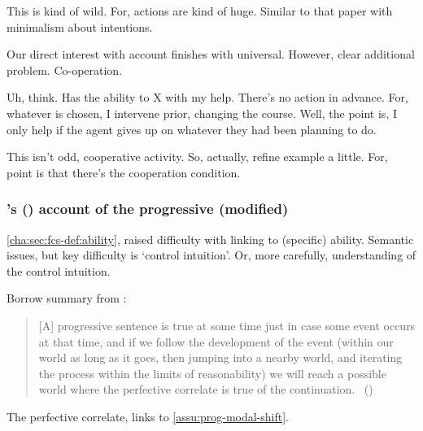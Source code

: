 \begin{note}
  This is kind of wild.
  For, actions are kind of huge.
  Similar to that paper with minimalism about intentions.
\end{note}

\begin{note}
  Our direct interest with account finishes with universal.
  However, clear additional problem.
  Co-operation.
\end{note}

\begin{note}
  Uh, think.
  Has the ability to X with my help.
  There's no action in advance.
  For, whatever is chosen, I intervene prior, changing the course.
  Well, the point is, I only help if the agent gives up on whatever they had been planning to do.

  This isn't odd, cooperative activity.
  So, actually, refine example a little.
  For, point is that there's the cooperation condition.
\end{note}

\subsubsection{\citeauthor{Landman:1992wh}'s (\citeyear{Landman:1992wh}) account of the progressive (modified)}
\label{cha:sec:fcs-def:progressive-landman}
\nocite{Portner:1998um}
\nocite{Engelberg:1999vi}

\begin{note}
  \autoref{cha:sec:fcs-def:ability}, raised difficulty with linking  to (specific) ability.
  Semantic issues, but key difficulty is `control intuition'.
  Or, more carefully, understanding of the control intuition.
\end{note}

\begin{note}
  Borrow summary from \textcite{Szabo:2004ul}:
  \begin{quote}
    [A] progressive sentence is true at some time just in case some event occurs at that time, and if we follow the development of the event (within our world as long as it goes, then jumping into a nearby world, and iterating the process within the limits of reasonability) we will reach a possible world where the perfective correlate is true of the continuation.%
    \mbox{ }\hfill\mbox{(\citeyear[34]{Szabo:2004ul})}
  \end{quote}
  The perfective correlate, links to \autoref{assu:prog-modal-shift}.
\end{note}

